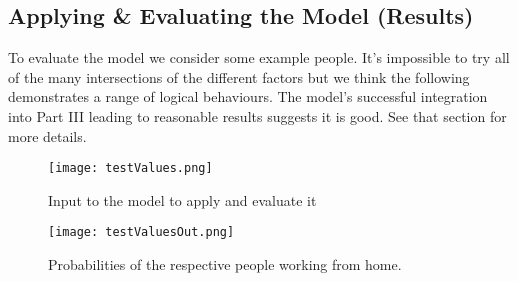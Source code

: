         \subsection{Applying & Evaluating the Model (Results)}  
            To evaluate the model we consider some example people. It's impossible to try all of the many intersections of the different factors but we think the following demonstrates a range of logical behaviours. The model's successful integration into Part III leading to reasonable results suggests it is good. See that section for more details.
            \begin{figure}[H] 
              \texttt{[image: testValues.png]}
              \caption{Input to the model to apply and evaluate it}
              \label{fig:testValues}
            \end{figure}  
            \begin{figure}[H]
              \texttt{[image: testValuesOut.png]}
              \caption{Probabilities of the respective people working from home.}
              \label{fig:testValuesOut}
            \end{figure}  
            
            